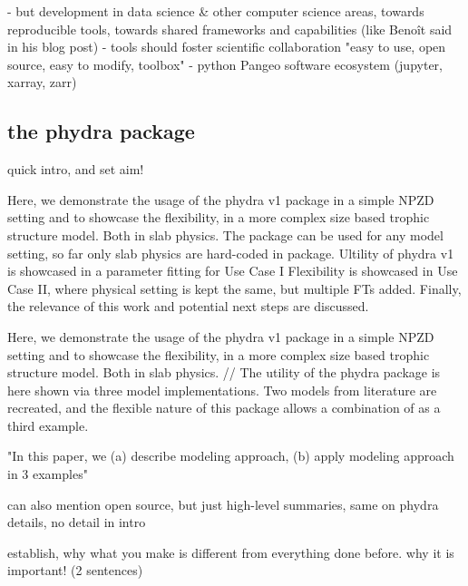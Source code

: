 \documentclass[template.tex]{subfiles}
\begin{document}
- but development in data science & other computer science areas, towards reproducible tools, towards shared frameworks and capabilities (like Benoît said in his blog post)
- tools should foster scientific collaboration
"easy to use, open source, easy to modify, toolbox"
- python Pangeo software ecosystem (jupyter, xarray, zarr)

\subsection{the phydra package}


quick intro, and set aim!

Here, we demonstrate the usage of the phydra v1 package in a simple NPZD setting and to showcase the flexibility, in a more complex size based trophic structure model. Both in slab physics.
The package can be used for any model setting, so far only slab physics are hard-coded in package.
Ultility of phydra v1 is showcased in a parameter fitting for Use Case I
Flexibility is showcased in Use Case II, where physical setting is kept the same, but multiple FTs added.
Finally, the relevance of this work and potential next steps are discussed.

Here, we demonstrate the usage of the phydra v1 package in a simple NPZD setting and to showcase the flexibility, in a more complex size based trophic structure model. Both in slab physics.
//
The utility of the phydra package is here shown via three model implementations. Two models from literature are recreated, and the flexible nature of this package allows a combination of as a third example. 


"In this paper, we (a) describe modeling approach, (b) apply modeling approach in 3 examples"

can also mention open source, but just high-level summaries, same on phydra details, no detail in intro

establish, why what you make is different from everything done before. why it is important! (2 sentences)
\end{document}
